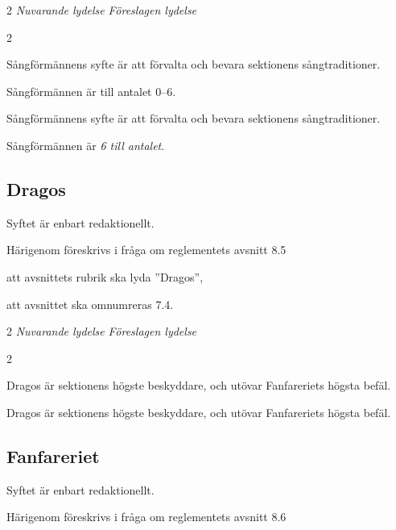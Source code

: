 \documentclass{article}
\newenvironment{lydelse}
    {\begin{paracol}{2}%
        \emph{Nuvarande lydelse}%
        \switchcolumn%
        \emph{Föreslagen lydelse}%
    \end{paracol}%
    \begin{enumerate}[label=\thesubsection.\arabic*]%
    \begin{paracol}{2}%
    }{\end{paracol}\end{enumerate}}
\begin{document}
\begin{lydelse}
    \setcounter{section}{8}
    \setcounter{subsection}{4}
    
    \item Sångförmännens syfte är att förvalta och bevara sektionens sångtraditioner.

	\item Sångförmännen är till antalet 0--6.
    
    \setcounter{section}{7}
    \setcounter{subsection}{3}
    \switchcolumn
    
    \item Sångförmännens syfte är att förvalta och bevara sektionens sångtraditioner.

    \item Sångförmännen är\emph{ 6 till antalet}.
    
\end{lydelse}

\subsection{Dragos}
Syftet är enbart redaktionellt.

Härigenom föreskrivs i fråga om reglementets avsnitt 8.5

\begin{dels}
    \item att avsnittets rubrik ska lyda ''Dragos'',
    \item att avsnittet ska omnumreras 7.4.
\end{dels}
\begin{lydelse}
    \setcounter{section}{8}
    \setcounter{subsection}{5}
    
    \item Dragos är sektionens högste beskyddare, och utövar Fanfareriets högsta befäl.
    
    \setcounter{section}{7}
    \setcounter{subsection}{3}
    \switchcolumn
    
    \item Dragos är sektionens högste beskyddare, och utövar Fanfareriets högsta befäl.
    
\end{lydelse}

\subsection{Fanfareriet}
Syftet är enbart redaktionellt.

Härigenom föreskrivs i fråga om reglementets avsnitt 8.6
\end{document}

